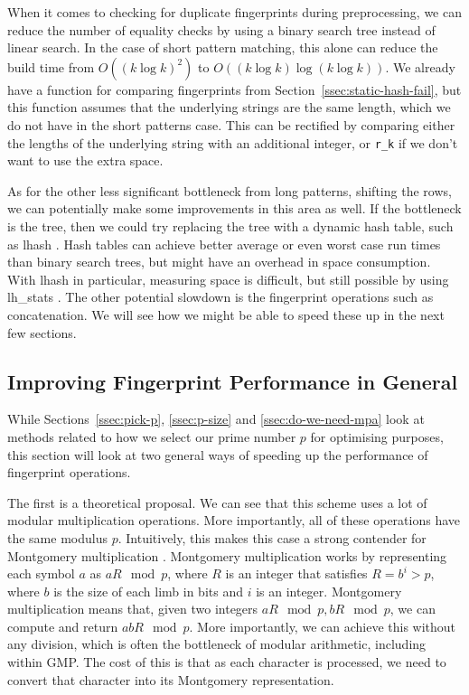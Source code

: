 \documentclass[ %
                    author={Dominic Joseph Moylett},
                    degree={MEng},
                     title={Dictionary Matching with Fingerprints},
                  subtitle={An Empirical Analysis},
                      type={research},
                      year={2015} ]{dissertation}
\begin{document}
When it comes to checking for duplicate fingerprints during preprocessing, we can reduce the number of equality checks by using a binary search tree instead of linear search. In the case of short pattern matching, this alone can reduce the build time from $O((k\log k)^2)$ to $O((k\log k)\log(k\log k))$. We already have a function for comparing fingerprints from Section~\ref{ssec:static-hash-fail}, but this function assumes that the underlying strings are the same length, which we do not have in the short patterns case. This can be rectified by comparing either the lengths of the underlying string with an additional integer, or \texttt{r\_k} if we don't want to use the extra space.

As for the other less significant bottleneck from long patterns, shifting the rows, we can potentially make some improvements in this area as well. If the bottleneck is the tree, then we could try replacing the tree with a dynamic hash table, such as lhash \cite{website:openssl-lhash}. Hash tables can achieve better average or even worst case run times than binary search trees, but might have an overhead in space consumption. With lhash in particular, measuring space is difficult, but still possible by using lh\_stats \cite{website:openssl-lhstats}. The other potential slowdown is the fingerprint operations such as concatenation. We will see how we might be able to speed these up in the next few sections.

\subsection{Improving Fingerprint Performance in General}

While Sections~\ref{ssec:pick-p}, \ref{ssec:p-size} and \ref{ssec:do-we-need-mpa} look at methods related to how we select our prime number $p$ for optimising purposes, this section will look at two general ways of speeding up the performance of fingerprint operations.

The first is a theoretical proposal. We can see that this scheme uses a lot of modular multiplication operations. More importantly, all of these operations have the same modulus $p$. Intuitively, this makes this case a strong contender for Montgomery multiplication \cite{montgomery:multiplication}. Montgomery multiplication works by representing each symbol $a$ as $aR \mod p$, where $R$ is an integer that satisfies $R = b^i > p$, where $b$ is the size of each limb in bits and $i$ is an integer. Montgomery multiplication means that, given two integers $aR\mod p, bR\mod p$, we can compute and return $abR\mod p$. More importantly, we can achieve this without any division, which is often the bottleneck of modular arithmetic, including within GMP. The cost of this is that as each character is processed, we need to convert that character into its Montgomery representation.
\end{document}
